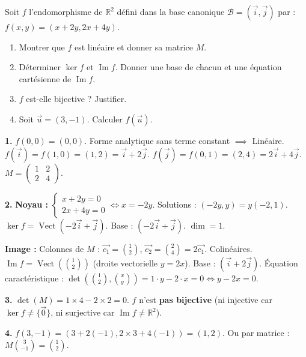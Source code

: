 \documentclass[11pt]{article}
\begin{document}
\begin{exoresolu}
Soit $f$ l'endomorphisme de $\mathbb{R}^2$ défini dans la base canonique $\mathcal{B}=(\vec{i},\vec{j})$ par :
$f(x,y) = (x+2y, 2x+4y)$.
\begin{enumerate}
  \item Montrer que $f$ est linéaire et donner sa matrice $M$.
  \item Déterminer $\ker f$ et $\operatorname{Im}f$. Donner une base de chacun et une équation cartésienne de $\operatorname{Im}f$.
  \item $f$ est-elle bijective ? Justifier.
  \item Soit $\vec{u} = (3, -1)$. Calculer $f(\vec{u})$.
\end{enumerate}
\tcblower
\textbf{1.} $f(0,0)=(0,0)$. Forme analytique sans terme constant $\implies$ Linéaire.
$f(\vec{i}) = f(1,0) = (1,2) = \vec{i}+2\vec{j}$.
$f(\vec{j}) = f(0,1) = (2,4) = 2\vec{i}+4\vec{j}$.
$M = \begin{pmatrix} 1 & 2 \\ 2 & 4 \end{pmatrix}$.

\textbf{2.} \textbf{Noyau :} $\begin{cases} x+2y=0 \\ 2x+4y=0 \end{cases} \iff x = -2y$.
Solutions : $(-2y, y) = y(-2, 1)$.
$\ker f = \operatorname{Vect}(-2\vec{i}+\vec{j})$. Base : $(-2\vec{i}+\vec{j})$. $\dim=1$.

\textbf{Image :} Colonnes de $M$ : $\vec{c_1}=\binom{1}{2}$, $\vec{c_2}=\binom{2}{4}=2\vec{c_1}$. Colinéaires.
$\operatorname{Im}f = \operatorname{Vect}(\binom{1}{2})$ (droite vectorielle $y=2x$).
Base : $(\vec{i}+2\vec{j})$.
Équation caractéristique : $\det(\binom{1}{2}, \binom{x}{y}) = 1\cdot y - 2\cdot x = 0 \iff y - 2x = 0$.

\textbf{3.} $\det(M) = 1\times 4 - 2\times 2 = 0$.
$f$ n'est \textbf{pas bijective} (ni injective car $\ker f \neq \{\vec{0}\}$, ni surjective car $\operatorname{Im}f \neq \mathbb{R}^2$).

\textbf{4.} $f(3,-1) = (3+2(-1), 2\times 3 + 4(-1)) = (1, 2)$.
Ou par matrice : $M \binom{3}{-1} = \binom{1}{2}$.
\end{exoresolu}
\end{document}
